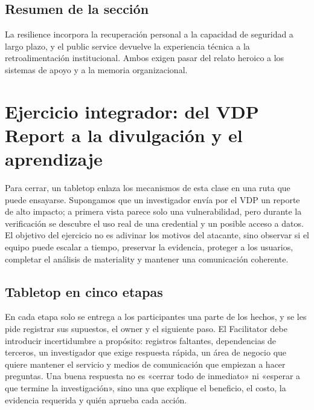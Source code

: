 \documentclass[a4paper]{article}
\begin{document}

\subsection{Resumen de la sección}

La resilience incorpora la recuperación personal a la capacidad de seguridad a largo plazo, y el public service devuelve la experiencia técnica a la retroalimentación institucional. Ambos exigen pasar del relato heroico a los sistemas de apoyo y a la memoria organizacional.
\section{Ejercicio integrador: del VDP Report a la divulgación y el aprendizaje}

Para cerrar, un tabletop enlaza los mecanismos de esta clase en una ruta que puede ensayarse. Supongamos que un investigador envía por el VDP un reporte de alto impacto; a primera vista parece solo una vulnerabilidad, pero durante la verificación se descubre el uso real de una credential y un posible acceso a datos. El objetivo del ejercicio no es adivinar los motivos del atacante, sino observar si el equipo puede escalar a tiempo, preservar la evidencia, proteger a los usuarios, completar el análisis de materiality y mantener una comunicación coherente.

\subsection{Tabletop en cinco etapas}

En cada etapa solo se entrega a los participantes una parte de los hechos, y se les pide registrar sus supuestos, el owner y el siguiente paso. El Facilitator debe introducir incertidumbre a propósito: registros faltantes, dependencias de terceros, un investigador que exige respuesta rápida, un área de negocio que quiere mantener el servicio y medios de comunicación que empiezan a hacer preguntas. Una buena respuesta no es «cerrar todo de inmediato» ni «esperar a que termine la investigación», sino una que explique el beneficio, el costo, la evidencia requerida y quién aprueba cada acción.
\end{document}
